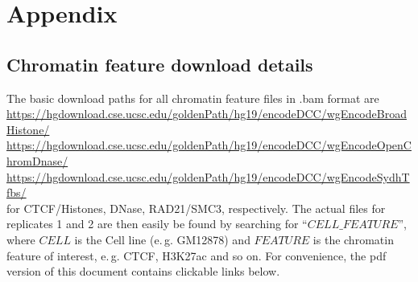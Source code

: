 \section{Appendix}

\subsection{Chromatin feature download details} \label{sec:chromFeat_download_links}
The basic download paths for all chromatin feature files in .bam format are\\
\small{\url{https://hgdownload.cse.ucsc.edu/goldenPath/hg19/encodeDCC/wgEncodeBroadHistone/}}\\
\small{\url{https://hgdownload.cse.ucsc.edu/goldenPath/hg19/encodeDCC/wgEncodeOpenChromDnase/}}\\
\small{\url{https://hgdownload.cse.ucsc.edu/goldenPath/hg19/encodeDCC/wgEncodeSydhTfbs/}}\\
for CTCF/Histones, DNase, RAD21/SMC3, respectively. 
The actual files for replicates 1 and 2 are then easily be found by searching for ``$\mathit{CELL}\_\mathit{FEATURE}$'', 
where $\mathit{CELL}$ is the Cell line (e.\,g. GM12878) and $\mathit{FEATURE}$
is the chromatin feature of interest, e.\,g. CTCF, H3K27ac and so on.
For convenience, the pdf version of this document contains clickable links below.

